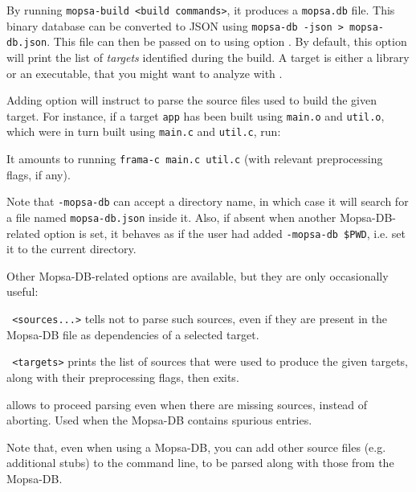 By running \verb|mopsa-build <build commands>|, it produces a
\verb|mopsa.db| file. This binary database can be converted to JSON using
\verb|mopsa-db -json > mopsa-db.json|. This file can then be passed on to
\FramaC using option . By default, this option
will print the list of {\em targets} identified during the build.
A target is either a library or an executable, that you might want to
analyze with \FramaC.

Adding option  will instruct \FramaC to parse
the source files used to build the given target. For instance, if a
target \texttt{app} has been built using \texttt{main.o} and \texttt{util.o},
which were in turn built using \texttt{main.c} and \texttt{util.c}, run:


It amounts to running \verb|frama-c main.c util.c| (with relevant
preprocessing flags, if any).

Note that \verb|-mopsa-db| can accept a directory name, in which case it will
search for a file named \verb|mopsa-db.json| inside it. Also, if absent when
another Mopsa-DB-related option is set, it behaves as if the user had added
\verb|-mopsa-db $PWD|, i.e. set it to the current directory.

Other Mopsa-DB-related options are available, but they are only occasionally
useful:

\begin{description}
\item \texttt{ <sources...>} tells \FramaC
  not to parse such sources, even if they are present in the Mopsa-DB file as
  dependencies of a selected target.
\item \texttt{ <targets>} prints the list of
  sources that were used to produce the given targets, along with their
  preprocessing flags, then exits.
\item {} allows \FramaC to proceed parsing even when
  there are missing sources, instead of aborting. Used when the Mopsa-DB
  contains spurious entries.
\end{description}

Note that, even when using a Mopsa-DB, you can add other source files (e.g.
additional stubs) to the command line, to be parsed along with those from
the Mopsa-DB.

